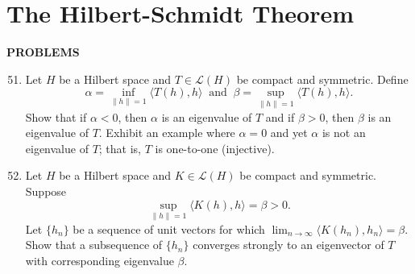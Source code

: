 \section{The Hilbert-Schmidt Theorem}
\begin{center}
	\textbf{PROBLEMS}
\end{center}
\begin{enumerate}
	\setcounter{enumi}{50}
    \item Let $H$ be a Hilbert space and $T\in\mathcal{L}(H)$ be compact and symmetric. Define
    \[
        \alpha=\underset{\|h\|=1}{\inf}\langle T(h),h\rangle\ \text{ and }\ \beta=\underset{\|h\|=1}{\sup}\langle T(h),h\rangle.
    \]
    Show that if $\alpha<0$, then $\alpha$ is an eigenvalue of $T$ and if $\beta>0$, then $\beta$ is an eigenvalue of $T$.
    Exhibit an example where $\alpha=0$ and yet $\alpha$ is not an eigenvalue of $T$; that is, $T$ is one-to-one (injective).
    \item Let $H$ be a Hilbert space and $K\in\mathcal{L}(H)$ be compact and symmetric.
    Suppose
    \[
        \underset{\|h\|=1}{\sup}\langle K(h),h\rangle=\beta>0.
    \] 
    Let $\{h_n\}$ be a sequence of unit vectors for which $\lim_{n\to\infty}\langle K(h_n),h_n\rangle=\beta$.
    Show that a subsequence of $\{h_n\}$ converges strongly to an eigenvector of $T$ with corresponding eigenvalue $\beta$.
\end{enumerate}

